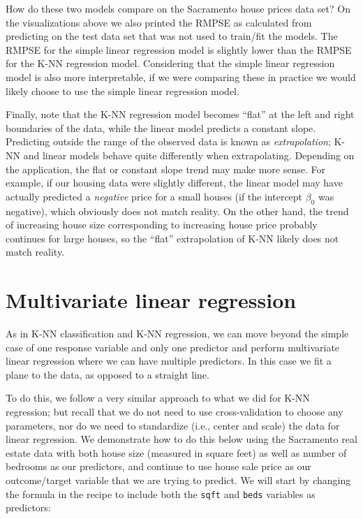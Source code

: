 \documentclass[
]{krantz}
\begin{document}
How do these two models compare on the Sacramento house prices data set? On
the visualizations above we also printed the RMPSE as calculated from
predicting on the test data set that was not used to train/fit the models. The RMPSE for the simple linear
regression model is slightly lower than the RMPSE for the K-NN regression model.
Considering that the simple linear regression model is also more interpretable,
if we were comparing these in practice we would likely choose to use the simple
linear regression model.

Finally, note that the K-NN regression model becomes ``flat''
at the left and right boundaries of the data, while the linear model
predicts a constant slope. Predicting outside the range of the observed
data is known as \emph{extrapolation}; K-NN and linear models behave quite differently
when extrapolating. Depending on the application, the flat
or constant slope trend may make more sense. For example, if our housing
data were slightly different, the linear model may have actually predicted
a \emph{negative} price for a small houses (if the intercept \(\beta_0\) was negative),
which obviously does not match reality. On the other hand, the trend of increasing
house size corresponding to increasing house price probably continues for large houses,
so the ``flat'' extrapolation of K-NN likely does not match reality.

\hypertarget{multivariate-linear-regression}{%
\section{Multivariate linear regression}\label{multivariate-linear-regression}}

As in K-NN classification and K-NN regression, we can move beyond the simple
case of one response variable and only one predictor and perform multivariate
linear regression where we can have multiple predictors. In this case we fit a
plane to the data, as opposed to a straight line.

To do this, we follow a very similar approach to what we did for
K-NN regression; but recall that we do not need to use cross-validation to choose any parameters,
nor do we need to standardize (i.e., center and scale) the data for linear regression.
We demonstrate how to do this below using the Sacramento real estate data with both house size
(measured in square feet) as well as number of bedrooms as our predictors, and
continue to use house sale price as our outcome/target variable that we are
trying to predict. We will start by changing the formula in the recipe to
include both the \texttt{sqft} and \texttt{beds} variables as predictors:
\end{document}
